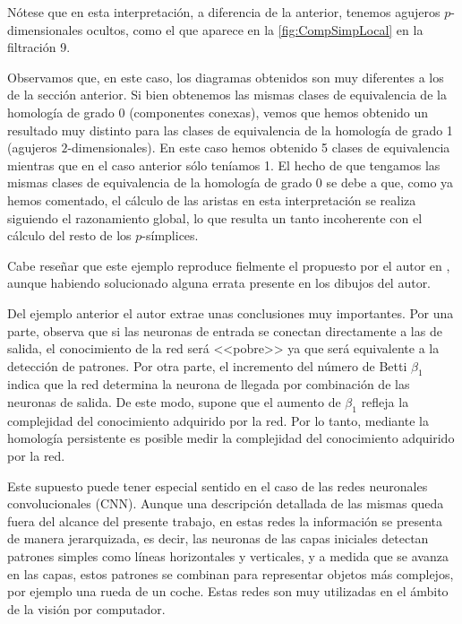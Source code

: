 \documentclass[12pt, a4paper, twoside]{book}
\numberwithin{equation}{section}
\theoremstyle{definition}
\newenvironment{ejem}
  {\pushQED{\qed}\renewcommand{\qedsymbol}{$\blacktriangleleft$}\ejemplo}
  {\popQED\endejemplo}
\theoremstyle{remark}
\theoremstyle{plain}
\begin{document}
\begin{ejem}
	Nótese que en esta interpretación, a diferencia de la anterior, 
	tenemos agujeros $p$-dimensionales ocultos, como el que aparece en 
	la \autoref{fig:CompSimpLocal} en la filtración 9.

	Observamos que, en este caso, los diagramas obtenidos son muy 
	diferentes a los de la sección anterior. Si bien obtenemos las mismas 
	clases de equivalencia de la homología de grado 0 (componentes 
	conexas), vemos que hemos obtenido un resultado muy distinto para las
	clases de equivalencia de la homología de grado 1 (agujeros 
	$2$-dimensionales). En este caso hemos obtenido 5 clases de 
	equivalencia mientras que en el caso anterior sólo teníamos 1. El 
	hecho de que tengamos las mismas clases de equivalencia de la 
	homología de grado 0 se debe a que, como ya hemos comentado, el 
	cálculo de las aristas en esta interpretación se realiza siguiendo el
	razonamiento global, lo que resulta un tanto incoherente con el 
	cálculo del resto de los $p$-símplices. 

	Cabe reseñar que este ejemplo reproduce fielmente el propuesto por el 
	autor en \cite{Articulo-Watanabe}, aunque habiendo solucionado alguna 
	errata presente en los dibujos del autor.
	\end{ejem}

	Del ejemplo anterior el autor extrae unas conclusiones muy 
	importantes. Por una parte, observa que si las neuronas de entrada se 
	conectan directamente a las de salida, el conocimiento de la red será 
	<<pobre>> ya que será equivalente a la detección de patrones. Por otra 
	parte, el incremento del número de Betti $\beta_{1}$ indica que la red 
	determina la neurona de llegada por combinación de las neuronas de 
	salida. De este modo, supone que el aumento de $\beta_{1}$ refleja la 
	complejidad del conocimiento adquirido por la red. Por lo tanto, 
	mediante la homología persistente es posible medir la complejidad del 
	conocimiento adquirido por la red.

	Este supuesto puede tener especial sentido en el caso de las redes 
	neuronales convolucionales (CNN). Aunque una descripción detallada de 
	las mismas queda fuera del alcance del presente trabajo, en estas 
	redes la información se presenta de manera jerarquizada, es decir, las
	neuronas de las capas iniciales detectan patrones simples como líneas
	horizontales y verticales, y a medida que se avanza en las capas, 
	estos patrones se combinan para representar objetos más complejos, por 
	ejemplo una rueda de un coche. Estas redes son muy utilizadas en el 
	ámbito de la visión por computador.
\end{document}
